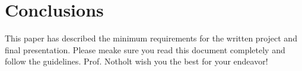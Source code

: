 	
	\section{Conclusions}
	
	This paper has described the minimum requirements for the written project and final presentation. Please meake sure you read this document completely and follow the guidelines. Prof. Notholt wish you the best for your endeavor!

